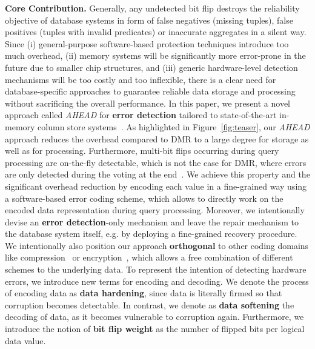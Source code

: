 \textbf{Core Contribution.}
Generally, any undetected bit flip destroys the reliability objective of database systems in form of false negatives (missing tuples), false positives (tuples with invalid predicates) or inaccurate aggregates in a silent way. Since (i) general-purpose software-based protection techniques introduce too much overhead, (ii) memory systems will be significantly more error-prone in the future due to smaller chip structures, and (iii) generic hardware-level detection mechanisms will be too costly and too inflexible, there is a clear need for database-specific approaches to guarantee reliable data storage and processing without sacrificing the overall performance. In this paper, we present a novel approach called \emph{AHEAD} for \textbf{error detection} tailored to state-of-the-art in-memory column store systems~\cite{DBLP:journals/debu/IdreosGNMMK12,DBLP:conf/vldb/StonebrakerABCCFLLMOORTZ05}. As highlighted in Figure~\ref{fig:teaser}, our \emph{AHEAD} approach reduces the overhead compared to DMR to a large degree for storage as well as for processing. Furthermore, multi-bit flips occurring during query processing are on-the-fly detectable, which is not the case for DMR, where errors are only detected during the voting at the end~\cite{DBLP:conf/isca/ReinhardtM00}. We achieve this property and the significant overhead reduction by encoding each value in a fine-grained way using a software-based error coding scheme, which allows to directly work on the encoded data representation during query processing. Moreover, we intentionally devise an \textbf{error detection}-only mechanism and leave the repair mechanism to the database system itself, e.g. by deploying a fine-grained recovery procedure. We intentionally also position our approach \textbf{orthogonal} to other coding domains like compression~\cite{DBLP:conf/sigmod/AbadiMF06} or encryption~\cite{DBLP:journals/sigmod/ShmueliVEG09}, which allows a free combination of different schemes to the underlying data. To represent the intention of detecting hardware errors, we introduce new terms for encoding and decoding. We denote the process of encoding data as \textbf{data hardening}, since data is literally firmed so that corruption becomes detectable. In contrast, we denote as \textbf{data softening} the decoding of data, as it becomes vulnerable to corruption again. Furthermore, we introduce the notion of \textbf{bit flip weight} as the number of flipped bits per logical data value. 


